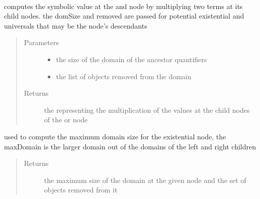\documentclass[letterpaper,10pt,english,openany,oneside]{sphinxmanual}
\begin{document}
\begin{fulllineitems}
\label{\detokenize{index:circuit.AndNode}}~

\begin{fulllineitems}
\label{\detokenize{index:circuit.AndNode.compute}}
computes the symbolic value at the and node by multiplying two terms at its child nodes. the domSize and removed are passed for 
potential existential and universals that may be the node’s descendants
\begin{quote}\begin{description}
\item[{Parameters}] \leavevmode\begin{itemize}
\item {} 
 \textendash{} the size of the domain of the ancestor quantifiers

\item {} 
 \textendash{} the list of objects removed from the domain

\end{itemize}

\item[{Returns}] \leavevmode
the {\hyperref[\detokenize{index:term.Term}]{}} representing the multiplication of the values at the child nodes of the or node

\end{description}\end{quote}

\end{fulllineitems}


\begin{fulllineitems}
\label{\detokenize{index:circuit.AndNode.maxDomainSize}}
used to compute the maximum domain size for the existential node, the maxDomain is the larger domain out of the domains of the
left and right children
\begin{quote}\begin{description}
\item[{Returns}] \leavevmode
the maximum size of the domain at the given node and the set of objects removed from it


\end{description}
\end{quote}
\end{fulllineitems}
\end{fulllineitems}
\end{document}
